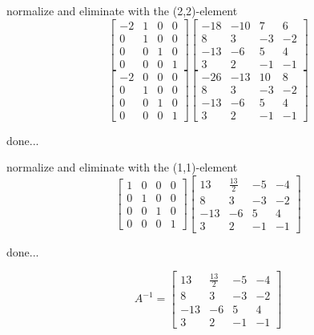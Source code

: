 \documentclass[12pt]{article}
\begin{document}
normalize and eliminate with the (2,2)-element
$$\left[{\begin{array}{cccc}-2& 1& 0& 0\\ 0& 1& 0& 0\\ 0& 0& 1& 0\\ 0& 0& 0& 1\end{array}}\right]\left[{\begin{array}{cccc}-18& -10& 7& 6\\ 8& 3& -3& -2\\ -13& -6& 5& 4\\ 3& 2& -1& -1\end{array}}\right]$$
$$\left[{\begin{array}{cccc}-2& 0& 0& 0\\ 0& 1& 0& 0\\ 0& 0& 1& 0\\ 0& 0& 0& 1\end{array}}\right]\left[{\begin{array}{cccc}-26& -13& 10& 8\\ 8& 3& -3& -2\\ -13& -6& 5& 4\\ 3& 2& -1& -1\end{array}}\right]$$
\par\noindent done...


normalize and eliminate with the (1,1)-element
$$\left[{\begin{array}{cccc}1& 0& 0& 0\\ 0& 1& 0& 0\\ 0& 0& 1& 0\\ 0& 0& 0& 1\end{array}}\right]\left[{\begin{array}{cccc}13& \frac{13}{2}& -5& -4\\ 8& 3& -3& -2\\ -13& -6& 5& 4\\ 3& 2& -1& -1\end{array}}\right]$$
\par\noindent done...


$$ A^{-1}=\left[{\begin{array}{cccc}13& \frac{13}{2}& -5& -4\\ 8& 3& -3& -2\\ -13& -6& 5& 4\\ 3& 2& -1& -1\end{array}}\right]$$
\end{document}
